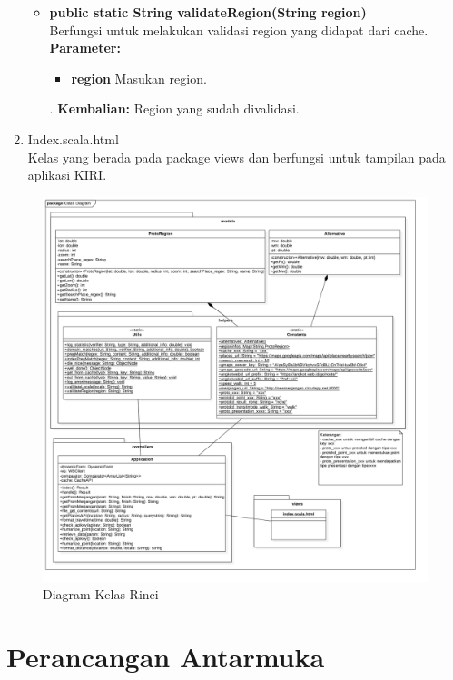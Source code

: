 \begin{enumerate}
\begin{itemize}
		\item \textbf{public static String validateRegion(String region)}\\
		Berfungsi untuk melakukan validasi region yang didapat dari cache.\\
		\textbf{Parameter:}
				\begin{itemize}
					\item \textbf{region} Masukan region.
				\end{itemize}.
		\textbf{Kembalian:}  Region yang sudah divalidasi.
		
	\end{itemize}
	
	\item Index.scala.html\\
	Kelas yang berada pada package views dan berfungsi untuk tampilan pada aplikasi KIRI.
	
\end{enumerate}


\begin{figure}[H]
	\centering
	\includegraphics[scale=0.4]{Gambar/Class-Diagram-Rinci}
	\caption{Diagram Kelas Rinci} 
	\label{fig:4_kelas_diagram_rinci}
\end{figure}


\section{Perancangan Antarmuka}
\label{sec:perancangan_antarmuka}

